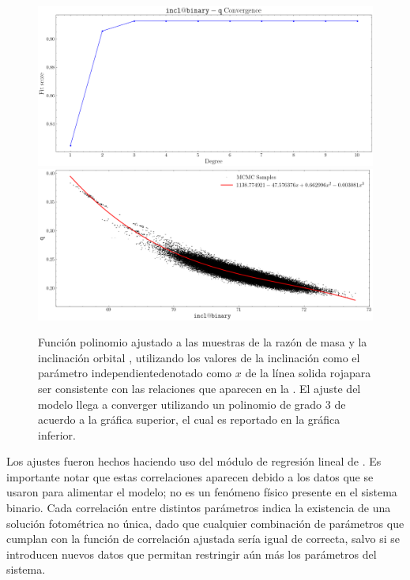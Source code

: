 \begin{figure}[!ht]
    \centering
    \includegraphics[scale=0.4]{Conclusion/Figures/Figura q-incl Correlacion Convergencia.png}
    \includegraphics[scale=0.4]{Conclusion/Figures/Figura q-incl Correlacion.png}
    \caption{Función polinomio ajustado a las muestras de la razón de masa
     y la inclinación orbital , utilizando los valores
    de la inclinación como el parámetro independiente\textemdash denotado como
    $x$ de la línea solida roja\textemdash para ser consistente con las
    relaciones que aparecen en la .
    El ajuste del modelo llega a converger utilizando un polinomio de grado 3 de
    acuerdo a la gráfica superior, el cual es reportado en la gráfica inferior.}
    \label{figuraCorrelacion_q_incl}
\end{figure}

Los ajustes fueron hechos haciendo uso del módulo de regresión lineal de
\href{https://scikit-learn.org/stable/modules/generated/sklearn.linear_model.LinearRegression.html}{}.
Es importante notar que estas correlaciones aparecen debido a los datos que se
usaron para alimentar el modelo; no es un fenómeno físico presente en el sistema
binario. Cada correlación entre distintos parámetros indica la existencia de una
solución fotométrica no única, dado que cualquier combinación de parámetros que
cumplan con la función de correlación ajustada sería igual de correcta, salvo si
se introducen nuevos datos que permitan restringir aún más los parámetros del
sistema.

